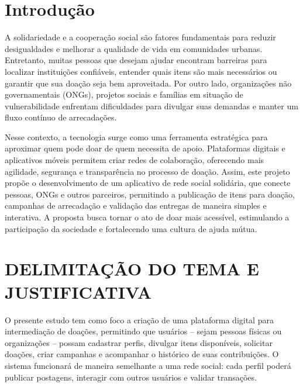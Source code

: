 \documentclass[%
  article,%
  a4paper,%
  12pt,%
  fleqn,%
  oneside,%
  chapter = TITLE,%
  section = TITLE,%
]{abntex2}
\affil{Universidade do Oeste Catarinense; Sistemas de Informação; Disciplina: Prática Profissional e Inserção Comunitária I}%
\begin{document}
\pretextual%

\begin{paginadetitulo}%
  
\end{paginadetitulo}

\textual%
\newpage
\section{Introdução}

A solidariedade e a cooperação social são fatores fundamentais para reduzir desigualdades e melhorar a qualidade de vida em comunidades urbanas. Entretanto, muitas pessoas que desejam ajudar encontram barreiras para localizar instituições confiáveis, entender quais itens são mais necessários ou garantir que sua doação seja bem aproveitada. Por outro lado, organizações não governamentais (ONGs), projetos sociais e famílias em situação de vulnerabilidade enfrentam dificuldades para divulgar suas demandas e manter um fluxo contínuo de arrecadações.

Nesse contexto, a tecnologia surge como uma ferramenta estratégica para aproximar quem pode doar de quem necessita de apoio. Plataformas digitais e aplicativos móveis permitem criar redes de colaboração, oferecendo mais agilidade, segurança e transparência no processo de doação. Assim, este projeto propõe o desenvolvimento de um aplicativo de rede social solidária, que conecte pessoas, ONGs e outros parceiros, permitindo a publicação de itens para doação, campanhas de arrecadação e validação das entregas de maneira simples e interativa. A proposta busca tornar o ato de doar mais acessível, estimulando a participação da sociedade e fortalecendo uma cultura de ajuda mútua.


\section{DELIMITAÇÃO DO TEMA E JUSTIFICATIVA}

O presente estudo tem como foco a criação de uma plataforma digital para intermediação de doações, permitindo que usuários – sejam pessoas físicas ou organizações – possam cadastrar perfis, divulgar itens disponíveis, solicitar doações, criar campanhas e acompanhar o histórico de suas contribuições. O sistema funcionará de maneira semelhante a uma rede social: cada perfil poderá publicar postagens, interagir com outros usuários e validar transações.
\end{document}
